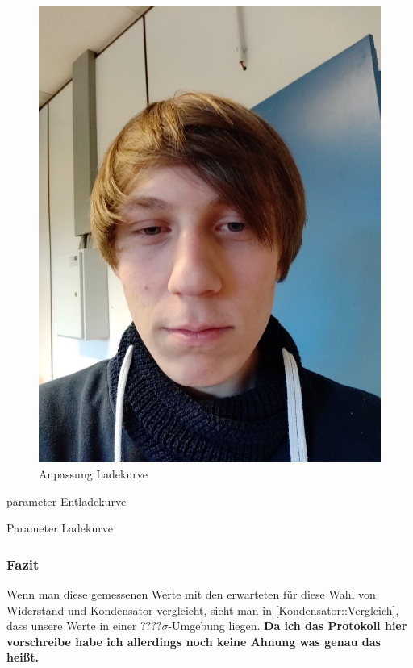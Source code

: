 \documentclass[12pt,twoside,a4paper]{scrartcl}
\begin{document}
\begin{figure}
\begin{minipage}{0.4 \textwidth}
							\includegraphics[width = \textwidth]{Pictures/Platzhalter.jpg}
							\caption{Anpassung Ladekurve}
					\end{minipage}
				\end{figure}

				\begin{table}
					\centering
					\begin{minipage}{0.4 \textwidth}
						
						\caption{parameter Entladekurve}
					\end{minipage}
					\begin{minipage}{0.4 \textwidth}
						
						\caption{Parameter Ladekurve}
					\end{minipage}
				\end{table}

			\subsubsection{Fazit}
				Wenn man diese gemessenen Werte mit den erwarteten für diese Wahl von Widerstand und Kondensator vergleicht, sieht man in \ref{Kondensator::Vergleich}, dass unsere Werte in einer $???? \sigma$-Umgebung liegen. \textbf{Da ich das Protokoll hier vorschreibe habe ich allerdings noch keine Ahnung was genau das heißt.}
\end{document}
